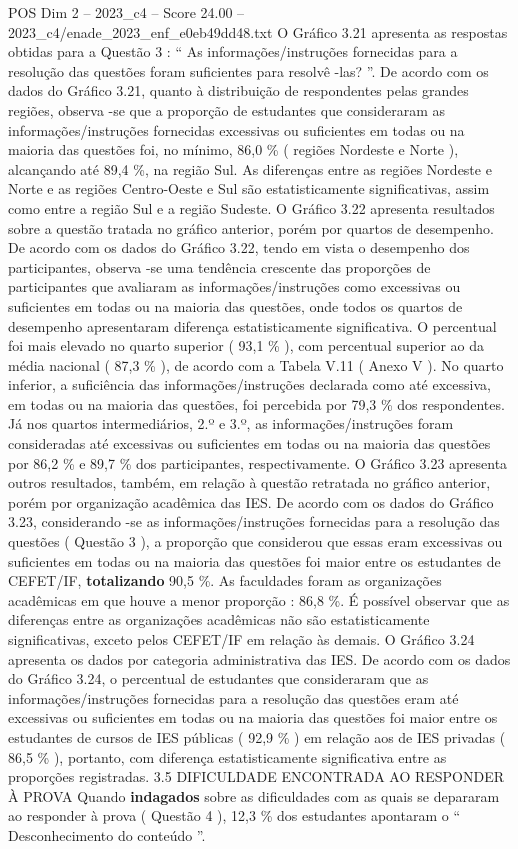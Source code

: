 \begin{textsample}{POS Dim 2 – 2023\_c4 – Score 24.00 – 2023\_c4/enade\_2023\_enf\_e0eb49dd48.txt}
O Gráfico 3.21 apresenta as respostas obtidas para a Questão 3 : “ As informações/instruções fornecidas para a resolução das questões foram suficientes para resolvê -las? ”.
De acordo com os dados do Gráfico 3.21, quanto à distribuição de respondentes pelas grandes regiões, observa -se que a proporção de estudantes que consideraram as informações/instruções fornecidas excessivas ou suficientes em todas ou na maioria das questões foi, no mínimo, 86,0 \% ( regiões Nordeste e Norte ), alcançando até 89,4 \%, na região Sul.
As diferenças entre as regiões Nordeste e Norte e as regiões Centro-Oeste e Sul são estatisticamente significativas, assim como entre a região Sul e a região Sudeste.
O Gráfico 3.22 apresenta resultados sobre a questão tratada no gráfico anterior, porém por quartos de desempenho.
De acordo com os dados do Gráfico 3.22, tendo em vista o desempenho dos participantes, observa -se uma tendência crescente das proporções de participantes que avaliaram as informações/instruções como excessivas ou suficientes em todas ou na maioria das questões, onde todos os quartos de desempenho apresentaram diferença estatisticamente significativa.
O percentual foi mais elevado no quarto superior ( 93,1 \% ), com percentual superior ao da média nacional ( 87,3 \% ), de acordo com a Tabela V.11 ( Anexo V ).
No quarto inferior, a suficiência das informações/instruções declarada como até excessiva, em todas ou na maioria das questões, foi percebida por 79,3 \% dos respondentes.
Já nos quartos intermediários, 2.º e 3.º, as informações/instruções foram consideradas até excessivas ou suficientes em todas ou na maioria das questões por 86,2 \% e 89,7 \% dos participantes, respectivamente.
O Gráfico 3.23 apresenta outros resultados, também, em relação à questão retratada no gráfico anterior, porém por organização acadêmica das IES.
De acordo com os dados do Gráfico 3.23, considerando -se as informações/instruções fornecidas para a resolução das questões ( Questão 3 ), a proporção que considerou que essas eram excessivas ou suficientes em todas ou na maioria das questões foi maior entre os estudantes de CEFET/IF, \textbf{totalizando} 90,5 \%.
As faculdades foram as organizações acadêmicas em que houve a menor proporção : 86,8 \%.
É possível observar que as diferenças entre as organizações acadêmicas não são estatisticamente significativas, exceto pelos CEFET/IF em relação às demais.
O Gráfico 3.24 apresenta os dados por categoria administrativa das IES.
De acordo com os dados do Gráfico 3.24, o percentual de estudantes que consideraram que as informações/instruções fornecidas para a resolução das questões eram até excessivas ou suficientes em todas ou na maioria das questões foi maior entre os estudantes de cursos de IES públicas ( 92,9 \% ) em relação aos de IES privadas ( 86,5 \% ), portanto, com diferença estatisticamente significativa entre as proporções registradas. 3.5 DIFICULDADE ENCONTRADA AO RESPONDER À PROVA Quando \textbf{indagados} sobre as dificuldades com as quais se depararam ao responder à prova ( Questão 4 ), 12,3 \% dos estudantes apontaram o “ Desconhecimento do conteúdo ”.

\end{textsample}

